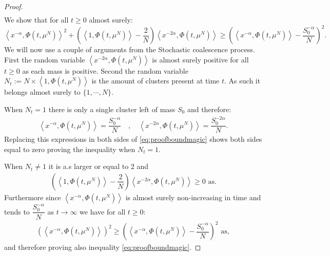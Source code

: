 \documentclass[11pt,a4paper]{article}
\begin{document}
\begin{proof}
\begin{multline*}
    \end{multline*}
    We show that for all $t\geq 0$ almost surely:
    \begin{equation}\label{eq:proofboundmagic}
        \left\langle x^{-\alpha},\Phi(t,\mu^N)\right\rangle^2 + \left(\left\langle 1,\Phi(t,\mu^N)\right\rangle - \dfrac{2}{N}\right)\left\langle x^{-2\alpha},\Phi(t,\mu^N)\right\rangle
        \geq \left(\left\langle x^{-\alpha},\Phi(t,\mu^N)\right\rangle- \dfrac{S_0^{-\alpha}}{N}\right)^2.
    \end{equation}
    We will now use a couple of arguments from the Stochastic coalescence process. First the random variable $\left\langle x^{-2\alpha},\Phi(t,\mu^N)\right\rangle$ is almost surely positive for all $t\geq 0$ as each mass is positive. Second the random variable $N_t := N\times\left\langle 1,\Phi(t,\mu^N)\right\rangle$ is the amount of clusters present at time $t$. As such it belongs almost surely to $\lbrace 1,\cdots,N\rbrace$. 
    
    When $N_t = 1$ there is only a single cluster left of mass $S_0$ and therefore:
    \begin{align*}
        \left\langle x^{-\alpha},\Phi(t,\mu^N)\right\rangle = \dfrac{S_0^{-\alpha}}{N} \quad,\quad \left\langle x^{-2\alpha},\Phi(t,\mu^N)\right\rangle = \dfrac{S_0^{-2\alpha}}{N}.
    \end{align*}
    Replacing this expressions in both sides of \eqref{eq:proofboundmagic} shows both sides equal to zero proving the inequality when $N_t = 1$.
    
    When $N_t \neq 1$ it is a.s larger or equal to $2$ and
    \begin{align*}
        \left(\left\langle 1,\Phi(t,\mu^N)\right\rangle - \dfrac{2}{N}\right)\left\langle x^{-2\alpha},\Phi(t,\mu^N)\right\rangle \geq 0 \text{ as}.
    \end{align*}
    Furthermore since $\left\langle x^{-\alpha},\Phi(t,\mu^N)\right\rangle$ is almost surely non-increasing in time and tends to $\dfrac{S_0^{-\alpha}}{N}$ as $t\to \infty$ we have for all $t\geq 0$:
    \begin{align*}
        \left(\left\langle x^{-\alpha},\Phi(t,\mu^N)\right\rangle\right)^2 \geq \left(\left\langle x^{-\alpha},\Phi(t,\mu^N)\right\rangle - \dfrac{S_0^{-\alpha}}{N}\right)^2 \text{ as},
    \end{align*}
    and therefore proving also inequality \eqref{eq:proofboundmagic}. 


\end{proof}
\end{document}
